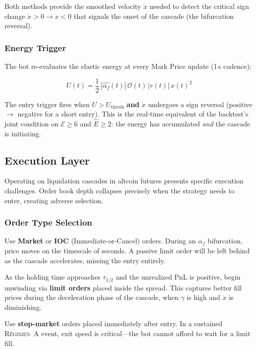 \documentclass[11pt,a4paper]{article}
\newcommand{\af}{\alpha_f}
\newcommand{\regime}[1]{\textsc{R\'{e}gimen~#1}}
\newcommand{\OI}{\mathcal{O}}
\begin{document}
Both methods provide the smoothed velocity $\dot{x}$ needed to detect the 
critical sign change $\dot{x} > 0 \to \dot{x} < 0$ that signals the onset 
of the cascade (the bifurcation reversal).

\subsubsection{Energy Trigger}

The bot re-evaluates the elastic energy at every Mark Price update (1\,s 
cadence):

\begin{equation}
\label{eq:trigger}
U(t) = \frac{1}{2}\,|\hat{\af}(t)|\,\OI(t)\,|r(t)|\,x(t)^2
\end{equation}

The entry trigger fires when $U > U_{\mathrm{thresh}}$ \textbf{and} $\dot{x}$ 
undergoes a sign reversal (positive $\to$ negative for a short entry). This 
is the real-time equivalent of the backtest's joint condition on 
$\mathcal{E} \ge 6$ and $\hat{E} \ge 2$: the energy has accumulated 
\emph{and} the cascade is initiating.


\subsection{Execution Layer}

Operating on liquidation cascades in altcoin futures presents specific 
execution challenges. Order book depth collapses precisely when the strategy 
needs to enter, creating adverse selection.

\subsubsection{Order Type Selection}

\begin{description}[leftmargin=2cm,style=nextline]
    \item[Entry] Use \textbf{Market} or \textbf{IOC} (Immediate-or-Cancel) 
    orders. During an $\af$ bifurcation, price moves on the timescale of 
    seconds. A passive limit order will be left behind as the cascade 
    accelerates, missing the entry entirely.
    
    \item[Exit (profitable)] As the holding time approaches $\tau_{1/2}$ and 
    the unrealized PnL is positive, begin unwinding via \textbf{limit orders} 
    placed inside the spread. This captures better fill prices during the 
    deceleration phase of the cascade, when $\gamma$ is high and $\dot{x}$ 
    is diminishing.
    
    \item[Exit (stop loss)] Use \textbf{stop-market} orders placed immediately 
    after entry. In a sustained \regime{A} event, exit speed is critical---the 
    bot cannot afford to wait for a limit fill.
\end{description}
\end{document}
